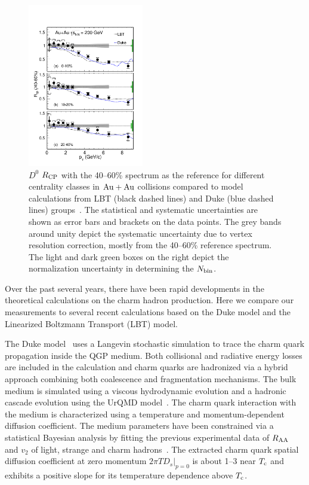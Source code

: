 \documentclass[%
 reprint,	
 amsmath,amssymb,
 aps,
 prc,
]{revtex4-1}
\begin{document}
\begin{figure}
\centering
\includegraphics[width=0.45\textwidth]{fig/D0_Rcp22.pdf}
  \caption{$D^{0}$ $R_{\rm CP}$ with the 40--60\% spectrum as the reference for different centrality classes in ${\rm{Au + Au}}$ collisions compared to model calculations from LBT (black dashed lines) and Duke (blue dashed lines) groups~\cite{Cao:2016gvr,LBT:private,Xu:2017obm}. The statistical and systematic uncertainties are shown as error bars and brackets on the data points. The grey bands around unity depict the systematic uncertainty due to vertex resolution correction, mostly from the 40--60\% reference spectrum. The light and dark green boxes on the right depict the normalization uncertainty in determining the $N_{\rm bin}$.}
\label{fig:D0_Rcp22} 
\end{figure}


Over the past several years, there have been rapid developments in the theoretical calculations on the charm hadron production. Here we compare our measurements to several recent calculations based on the Duke model and the Linearized Boltzmann Transport (LBT) model.

The Duke model~\cite{Duke,Xu:2017obm} uses a Langevin stochastic simulation to trace the charm quark propagation inside the QGP medium. Both collisional and radiative energy losses are included in the calculation and charm quarks are hadronized via a hybrid approach combining both coalescence and fragmentation mechanisms. The bulk medium is simulated using a viscous hydrodynamic evolution and a hadronic cascade evolution using the UrQMD model~\cite{urQMD}. The charm quark interaction with the medium is characterized using a temperature and momentum-dependent diffusion coefficient. The medium parameters have been constrained via a statistical Bayesian analysis by fitting the previous experimental data of $R_{\rm AA}$ and $v_{2}$ of light, strange and charm hadrons~\cite{Xu:2017obm}. The extracted charm quark spatial diffusion coefficient at zero momentum $2\pi TD_s|_{p=0}$ is about 1--3 near $T_{\rm c}$ and exhibits a positive slope for its temperature dependence above $T_{\rm c}$.
\end{document}
